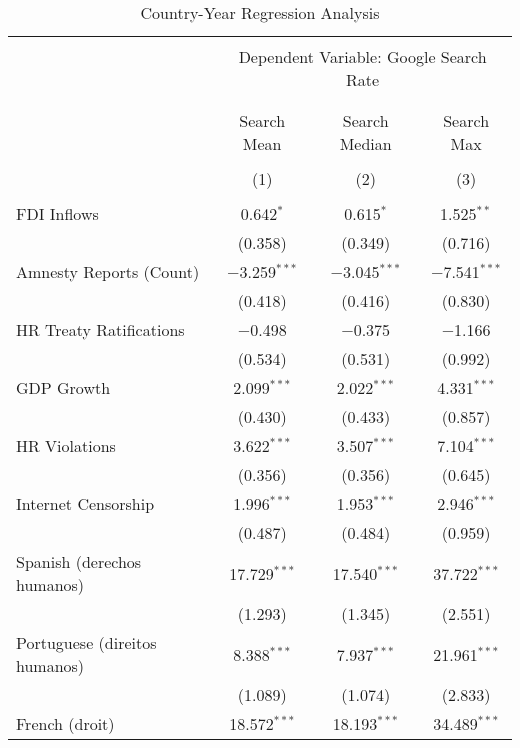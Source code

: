 
\begin{table}[!htbp] \centering 
  \caption{Country-Year Regression Analysis} 
  \label{} 
\begin{tabular}{@{\extracolsep{5pt}}lccc} 
\\[-1.8ex]\hline 
\hline \\[-1.8ex] 
 & \multicolumn{3}{c}{Dependent Variable: Google Search Rate} \\ 
\cline{2-4} 
\\[-1.8ex] & \multicolumn{3}{c}{ } \\ 
 & Search Mean & Search Median & Search Max \\ 
\\[-1.8ex] & (1) & (2) & (3)\\ 
\hline \\[-1.8ex] 
 FDI Inflows & 0.642$^{*}$ & 0.615$^{*}$ & 1.525$^{**}$ \\ 
  & (0.358) & (0.349) & (0.716) \\ 
  Amnesty Reports (Count) & $-$3.259$^{***}$ & $-$3.045$^{***}$ & $-$7.541$^{***}$ \\ 
  & (0.418) & (0.416) & (0.830) \\ 
  HR Treaty Ratifications & $-$0.498 & $-$0.375 & $-$1.166 \\ 
  & (0.534) & (0.531) & (0.992) \\ 
  GDP Growth & 2.099$^{***}$ & 2.022$^{***}$ & 4.331$^{***}$ \\ 
  & (0.430) & (0.433) & (0.857) \\ 
  HR Violations & 3.622$^{***}$ & 3.507$^{***}$ & 7.104$^{***}$ \\ 
  & (0.356) & (0.356) & (0.645) \\ 
  Internet Censorship & 1.996$^{***}$ & 1.953$^{***}$ & 2.946$^{***}$ \\ 
  & (0.487) & (0.484) & (0.959) \\ 
  Spanish (derechos humanos) & 17.729$^{***}$ & 17.540$^{***}$ & 37.722$^{***}$ \\ 
  & (1.293) & (1.345) & (2.551) \\ 
  Portuguese (direitos humanos) & 8.388$^{***}$ & 7.937$^{***}$ & 21.961$^{***}$ \\ 
  & (1.089) & (1.074) & (2.833) \\ 
  French (droit) & 18.572$^{***}$ & 18.193$^{***}$ & 34.489$^{***}$ \\ 

\end{tabular}
\end{table}
